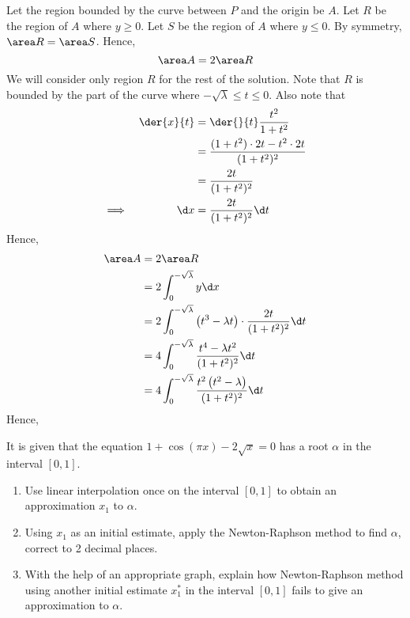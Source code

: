 \documentclass{jhwhw}
\begin{document}
            \noindent Let the region bounded by the curve between $P$ and the origin be $A$. Let $R$ be the region of $A$ where $y \geq 0$. Let $S$ be the region of $A$ where $y \leq 0$. By symmetry, $\area R = \area S$. Hence,
            \begin{equation*}
                \area A = 2\area R
            \end{equation*}
            We will consider only region $R$ for the rest of the solution. Note that $R$ is bounded by the part of the curve where $-\sqrt \lambda \leq t \leq 0$. Also note that
            \begin{alignat*}{2}
                &&\der{x}{t} &= \der{}{t} \dfrac{t^2}{1 + t^2}\\
                && &= \dfrac{(1+t^2) \cdot 2t - t^2 \cdot 2t}{(1+t^2)^2}\\
                && &= \dfrac{2t}{(1+t^2)^2}\\
                \implies&&\d x &= \dfrac{2t}{(1+t^2)^2} \d t
            \end{alignat*}
            Hence,
            \begin{align*}
                \area A &= 2 \area R\\
                &= 2 \int_0^{-\sqrt{\lambda}} y \d x\\
                &= 2 \int_0^{-\sqrt{\lambda}} \left(t^3 - \lambda t\right) \cdot \dfrac{2t}{(1+t^2)^2} \d t\\
                &= 4 \int_0^{-\sqrt{\lambda}}\dfrac{t^4 - \lambda t^2}{(1+t^2)^2} \d t\\
                &= 4 \int_0^{-\sqrt{\lambda}}\dfrac{t^2 \left(t^2 - \lambda\right)}{(1+t^2)^2} \d t
            \end{align*}
            Hence,

    \problem{}
        It is given that the equation $1 + \cos(\pi x) - 2\sqrt{x} = 0$ has a root $\alpha$ in the interval $[0, 1]$.

        \begin{enumerate}
            \item Use linear interpolation once on the interval $[0, 1]$ to obtain an approximation $x_1$ to $\alpha$.
            \item Using $x_1$ as an initial estimate, apply the Newton-Raphson method to find $\alpha$, correct to 2 decimal places.
            \item With the help of an appropriate graph, explain how Newton-Raphson method using another initial estimate $x_1^\ast$ in the interval $[0, 1]$ fails to give an approximation to $\alpha$.
        \end{enumerate}
    
\end{document}
